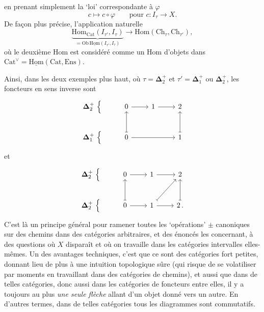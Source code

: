 \documentclass[11pt]{article}
\newcommand{\printedpage}[1]{\if\relax\detokenize{#1}\relax\else\marginpar{\raggedright\footnotesize p.~#1}\fi}
\newcommand{\msp}[1]{\marginpar{\raggedright\footnotesize [#1]}}
\newcommand{\bDelta}{\boldsymbol{\Delta}}
\newcommand{\uHom}{\underline{\mathrm{Hom}}}
\newcommand{\Hom}{\mathrm{Hom}}
\newcommand{\Cat}{\mathrm{Cat}}
\begin{document}
\printedpage{14}

en prenant simplement la ‘loi’ correspondante à $\varphi$
\[
c \longmapsto c\circ\varphi \qquad \text{pour } c : I_\tau \longrightarrow X.
\]
De façon plus précise, l'application naturelle
\[
\underbrace{\Hom_{\Cat}(I_{\tau'},I_\tau)}_{=\mathrm{Ob}\,\uHom(I_{\tau'},I_\tau)} \longrightarrow \Hom(\mathrm{Ch}_\tau,\mathrm{Ch}_{\tau'}),
\]
\msp{page 22}
où le deuxième Hom est considéré comme un Hom d'objets dans $\Cat^{\vee}=\uHom(\Cat,\mathrm{Ens})$.
\par\Needspace{70mm}\noindent
Ainsi, dans les deux exemples plus haut, où $\tau=\bDelta_2^+$ et $\tau'=\bDelta_1^+$ ou $\bDelta_2^+$, les foncteurs en sens inverse sont
\[
\begin{tikzcd}
\bDelta_2^+\ \Big\{ & 0 \arrow[r] & 1 \arrow[r] & 2 \\
\bDelta_1^+\ \Big\{ & 0 \arrow[u, mapsto] \arrow[rr] & & 1 \arrow[u, mapsto]
\end{tikzcd}
\]
et
\[
\begin{tikzcd}
\bDelta_2^+\ \Big\{ & 0 \arrow[r] & 1 \arrow[r] & 2 \\
\bDelta_2^+\ \Big\{ & 0 \arrow[u, mapsto] \arrow[r] & 1 \arrow[ur, mapsto] \arrow[r] & 2\,. \arrow[u, mapsto]
\end{tikzcd}
\]
C'est là un principe général pour ramener toutes les ‘opérations’ $\pm$ canoniques sur des chemins dans des catégories arbitraires, et des énoncés les concernant, à des questions où $X$ disparaît et où on travaille dans les catégories intervalles elles-mêmes. Un des avantages techniques, c'est que ce sont des catégories fort petites, donnant lieu de plus à une intuition topologique sûre (qui risque de se volatiliser par moments en travaillant dans des catégories de chemins), et aussi que dans de telles catégories, donc aussi dans les catégories de foncteurs entre elles, il y a toujours au plus
\msp{page 23}
\textit{une seule flèche} allant d'un objet donné vers un autre. En d'autres termes, dans de telles catégories tous les diagrammes sont commutatifs.
\end{document}
